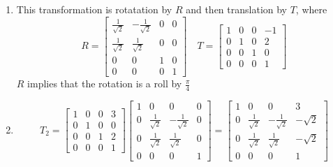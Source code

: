 \documentclass[11pt]{article}
\begin{document}
\begin{solution}

\begin{enumerate}[1.]
    \item 
        This transformation is rotatation by $R$ and then translation by $T$, where\\
        \[
            R =
            \begin{bmatrix}
                \frac{1}{\sqrt{2}} & -\frac{1}{\sqrt{2}} & 0 & 0\\
                \frac{1}{\sqrt{2}} & \frac{1}{\sqrt{2}} & 0 & 0\\
                0 & 0 & 1 & 0\\
                0 & 0 & 0 & 1
            \end{bmatrix}
            \quad
            T = 
            \begin{bmatrix}
                1 & 0 & 0 & -1\\
                0 & 1 & 0 & 2\\
                0 & 0 & 1 & 0\\
                0 & 0 & 0 & 1
            \end{bmatrix}
        \]
        $R$ implies that the rotation is a roll by $\frac{\pi}{4}$
    \item
        \[
            T_2 =
            \begin{bmatrix}
                1 & 0 & 0 & 3\\
                0 & 1 & 0 & 0\\
                0 & 0 & 1 & 2\\
                0 & 0 & 0 & 1
            \end{bmatrix}
            \begin{bmatrix}
                1 & 0 & 0 & 0\\
                0 & \frac{1}{\sqrt{2}} & -\frac{1}{\sqrt{2}} & 0\\
                0 & \frac{1}{\sqrt{2}} & \frac{1}{\sqrt{2}} & 0\\
                0 & 0 & 0 & 1
            \end{bmatrix}
            =
            \begin{bmatrix}
                1 & 0 & 0 & 3\\
                0 & \frac{1}{\sqrt{2}} & -\frac{1}{\sqrt{2}} & -\sqrt{2}\\
                0 & \frac{1}{\sqrt{2}} & \frac{1}{\sqrt{2}} & -\sqrt{2}\\
                0 & 0 & 0 & 1

\end{bmatrix}\]
\end{enumerate}
\end{solution}
\end{document}
